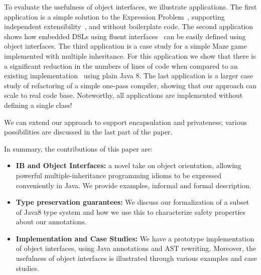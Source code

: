 To evaluate the usefulness of object interfaces, we illustrate
\numOfCaseStudies {} 
applications. The first application is a simple 
solution to the Expression Problem~\cite{wadler98expression}, supporting independent 
extensibility~\cite{zenger05independentlyextensible}, and without boilerplate code. The second
application shows how embedded DSLs using fluent interfaces~\cite{fowler2005fluentinterface} 
can be easily defined using object interfaces. The third
application is a case study for a simple Maze game implemented with 
multiple inheritance. For this application we show that there is a
significant reduction in the numbers of lines of code when compared 
to an existing implementation~\cite{bono14} using plain Java 8. The last
application is a larger case study of refactoring of a simple one-pass compiler, showing that our
approach can scale to real code base. Noteworthy, all applications are implemented 
without defining a single class!

We can extend our approach to support encapsulation and privateness;
various possibilities are discussed in the last part of the paper.


In summary, the contributions of this paper are:
\begin{itemize}

\item {\bf IB and Object Interfaces:} a novel take on object orientation, allowing
  powerful multiple-inheritance programming idioms to be expressed
  conveniently in Java. We provide examples, informal and formal description.

\item{\bf Type preservation guarantees:}
We discuss our formalization of a subset of Java8 type system and how we use this
to characterize safety properties about our annotations.

\item {\bf Implementation and Case Studies:} We have a prototype
  implementation of object interfaces, using Java
  annotations and AST rewriting. Moreover, the usefulness of object interfaces is
  illustrated through various examples and case studies.


\end{itemize}
